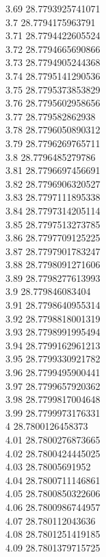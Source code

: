 {3.69	28.7793925741071\\
3.7	28.7794175963791\\
3.71	28.7794422605524\\
3.72	28.7794665690866\\
3.73	28.7794905244368\\
3.74	28.7795141290536\\
3.75	28.7795373853829\\
3.76	28.7795602958656\\
3.77	28.779582862938\\
3.78	28.7796050890312\\
3.79	28.7796269765711\\
3.8	28.7796485279786\\
3.81	28.7796697456691\\
3.82	28.7796906320527\\
3.83	28.7797111895338\\
3.84	28.7797314205114\\
3.85	28.7797513273785\\
3.86	28.7797709125225\\
3.87	28.7797901783247\\
3.88	28.7798091271606\\
3.89	28.7798277613993\\
3.9	28.779846083404\\
3.91	28.7798640955314\\
3.92	28.7798818001319\\
3.93	28.7798991995494\\
3.94	28.7799162961213\\
3.95	28.7799330921782\\
3.96	28.7799495900441\\
3.97	28.7799657920362\\
3.98	28.7799817004648\\
3.99	28.7799973176331\\
4	28.7800126458373\\
4.01	28.7800276873665\\
4.02	28.7800424445025\\
4.03	28.78005691952\\
4.04	28.7800711146861\\
4.05	28.7800850322606\\
4.06	28.7800986744957\\
4.07	28.780112043636\\
4.08	28.7801251419185\\
4.09	28.7801379715725\\
}
